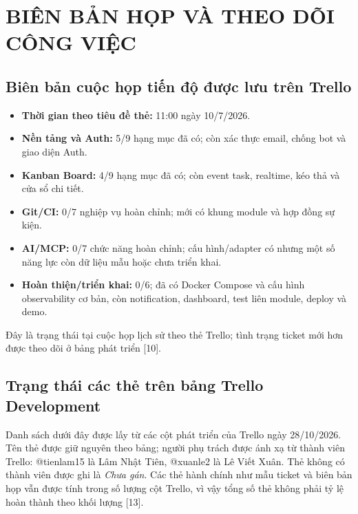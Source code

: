 \documentclass[12pt,a4paper]{report}
\begin{document}
\appendix
\chapter{BIÊN BẢN HỌP VÀ THEO DÕI CÔNG VIỆC}
\section{Biên bản cuộc họp tiến độ được lưu trên Trello}
\begin{itemize}
    \item \textbf{Thời gian theo tiêu đề thẻ:} 11:00 ngày 10/7/2026.
    \item \textbf{Nền tảng và Auth:} 5/9 hạng mục đã có; còn xác thực email, chống bot và giao diện Auth.
    \item \textbf{Kanban Board:} 4/9 hạng mục đã có; còn event task, realtime, kéo thả và cửa sổ chi tiết.
    \item \textbf{Git/CI:} 0/7 nghiệp vụ hoàn chỉnh; mới có khung module và hợp đồng sự kiện.
    \item \textbf{AI/MCP:} 0/7 chức năng hoàn chỉnh; cấu hình/adapter có nhưng một số năng lực còn dữ liệu mẫu hoặc chưa triển khai.
    \item \textbf{Hoàn thiện/triển khai:} 0/6; đã có Docker Compose và cấu hình observability cơ bản, còn notification, dashboard, test liên module, deploy và demo.
\end{itemize}
Đây là trạng thái tại cuộc họp lịch sử theo thẻ Trello; tình trạng ticket mới hơn được theo dõi ở bảng phát triển [10].

\section{Trạng thái các thẻ trên bảng Trello Development}
Danh sách dưới đây được lấy từ các cột phát triển của Trello ngày 28/10/2026. Tên thẻ được giữ nguyên theo bảng; người phụ trách được ánh xạ từ thành viên Trello: @tienlam15 là Lâm Nhật Tiên, @xuanle2 là Lê Viết Xuân. Thẻ không có thành viên được ghi là \emph{Chưa gán}. Các thẻ hành chính như mẫu ticket và biên bản họp vẫn được tính trong số lượng cột Trello, vì vậy tổng số thẻ không phải tỷ lệ hoàn thành theo khối lượng [13].
\end{document}
